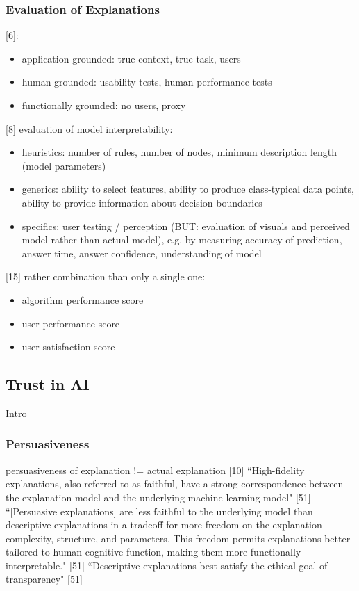 \subsubsection{Evaluation of Explanations}
[6]:
\begin{itemize}
	\item application grounded: true context, true task, users
	\item human-grounded: usability tests, human performance tests
	\item functionally grounded: no users, proxy
\end{itemize}
[8] evaluation of model interpretability:
\begin{itemize}
	\item heuristics: number of rules, number of nodes, minimum description length (model parameters)
	\item generics: ability to select features, ability to produce class-typical data points, ability to provide information about decision boundaries
	\item specifics: user testing / perception (BUT: evaluation of visuals and perceived model rather than actual model), e.g. by measuring accuracy of prediction, answer time, answer confidence, understanding of model
\end{itemize}
[15] rather combination than only a single one:
\begin{itemize}
	\item algorithm performance score
	\item user performance score
	\item user satisfaction score 
\end{itemize}


\subsection{Trust in AI}
Intro

\subsubsection{Persuasiveness}
persuasiveness of explanation != actual explanation [10]\newline
``High-fidelity explanations, also referred to as faithful, have a strong correspondence between the explanation model and the underlying machine learning model" [51]\newline
``[Persuasive explanations] are less faithful to the underlying model than descriptive explanations in a tradeoff for more freedom on the explanation complexity, structure, and parameters. This freedom permits explanations better tailored to human cognitive function, making them more functionally interpretable." [51]\newline
``Descriptive explanations best satisfy the ethical goal of transparency" [51]\newline


